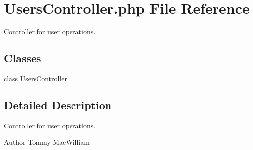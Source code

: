 \hypertarget{UsersController_8php}{
\section{\-Users\-Controller.php \-File \-Reference}
\label{UsersController_8php}
}


\-Controller for user operations.  


\subsection*{\-Classes}
\begin{DoxyCompactItemize}
\item 
class \hyperlink{classUsersController}{\-Users\-Controller}
\end{DoxyCompactItemize}


\subsection{\-Detailed \-Description}
\-Controller for user operations. \begin{DoxyAuthor}{\-Author}
\-Tommy \-Mac\-William 
\end{DoxyAuthor}

